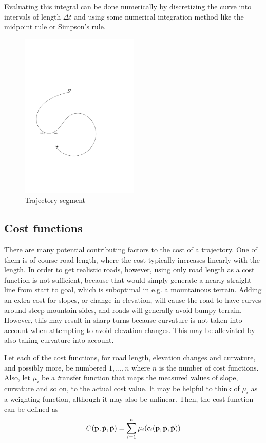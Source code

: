 Evaluating this integral can be done numerically by discretizing the curve into intervals of length $\Delta t$ and using some numerical integration method like the midpoint rule or Simpson's rule.

\begin{figure}[ht]
\centering
\includegraphics[width=0.5\textwidth]{figure/trajectory_segment}
\caption{Trajectory segment}
\label{fig:trajectory_segment}
\end{figure}

\subsection{Cost functions}
There are many potential contributing factors to the cost of a trajectory. One of them is of course road length, where the cost typically increases linearly with the length. In order to get realistic roads, however, using only road length as a cost function is not sufficient, because that would simply generate a nearly straight line from start to goal, which is suboptimal in e.g. a mountainous terrain. Adding an extra cost for slopes, or change in elevation, will cause the road to have curves around steep mountain sides, and roads will generally avoid bumpy terrain. However, this may result in sharp turns because curvature is not taken into account when attempting to avoid elevation changes. This may be alleviated by also taking curvature into account.

Let each of the cost functions, for road length, elevation changes and curvature, and possibly more, be numbered $1, ..., n$ where $n$ is the number of cost functions. Also, let $\mu_i$ be a {\textit transfer function} that maps the measured values of slope, curvature and so on, to the actual cost value. It may be helpful to think of $\mu_i$ as a weighting function, although it may also be unlinear. Then, the cost function can be defined as
$$
C({\mathbf p}, \dot{{\mathbf p}}, \ddot{\mathbf{p}}) = \sum_{i=1}^{n} \mu_i(c_i({\mathbf p}, \dot{{\mathbf p}}, \ddot{\mathbf{p}}))
$$

